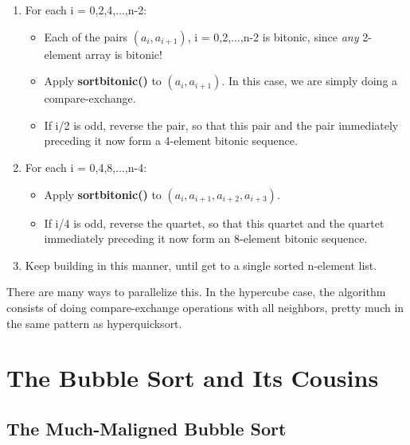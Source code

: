 \begin{enumerate}

\item For each i = 0,2,4,...,n-2:

   \begin{itemize}

   \item Each of the pairs $(a_i,a_{i+1})$, i = 0,2,...,n-2 is bitonic,
   since {\it any} 2-element array is bitonic!  

   \item Apply {\bf sortbitonic()} to  $(a_i,a_{i+1})$.  In this case,
   we are simply doing a compare-exchange.

   \item If i/2 is odd, reverse the pair, so that this pair and the pair
   immediately preceding it now form a 4-element bitonic sequence.

   \end{itemize}

\item For each i = 0,4,8,...,n-4:

   \begin{itemize}

   \item Apply {\bf sortbitonic()} to  $(a_i,a_{i+1},a_{i+2},a_{i+3})$.

   \item If i/4 is odd, reverse the quartet, so that this quartet and
   the quartet immediately preceding it now form an 8-element bitonic
   sequence.

   \end{itemize}

\item Keep building in this manner, until get to a single sorted
n-element list.

\end{enumerate}

There are many ways to parallelize this.  In the hypercube case, the
algorithm consists of doing compare-exchange operations with all
neighbors, pretty much in the same pattern as hyperquicksort.  

\section{The Bubble Sort and Its Cousins}

\subsection{The Much-Maligned Bubble Sort}

